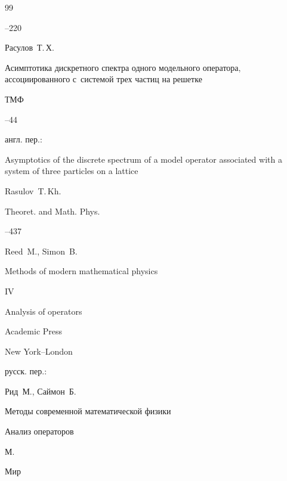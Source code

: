\begin{thebibliography}{99}



--220




\by Расулов~Т.\,Х.

\paper Асимптотика дискретного спектра одного модельного оператора, ассоциированного с~системой трех частиц на решетке

\jour ТМФ




--44

\transl англ. пер.:~

\paper Asymptotics of the discrete spectrum of a model operator associated with a system of three particles on a lattice

\by Rasulov~T.\,Kh.

\jour Theoret. and Math. Phys.




--437






\by Reed~M., Simon~B.

\book Methods of modern mathematical physics

\bookvol IV

\voltitle Analysis of operators

\publ Academic Press

\publaddr New York--London





\rtransl русск. пер.:~

\by Рид~М., Саймон~Б.

\book Методы современной математической физики


\voltitle Анализ операторов

\publaddr М.

\publ Мир







\end{thebibliography}









